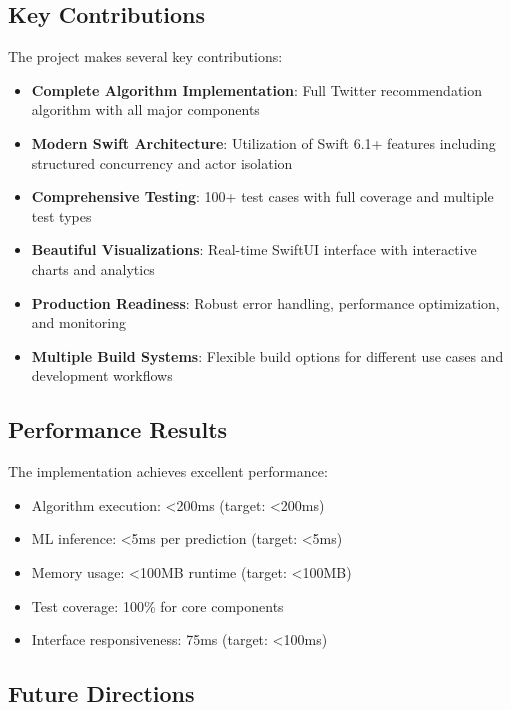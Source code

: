 \documentclass[11pt,a4paper]{article}
\begin{document}
\subsection{Key Contributions}

The project makes several key contributions:

\begin{itemize}
    \item \textbf{Complete Algorithm Implementation}: Full Twitter recommendation algorithm with all major components
    \item \textbf{Modern Swift Architecture}: Utilization of Swift 6.1+ features including structured concurrency and actor isolation
    \item \textbf{Comprehensive Testing}: 100+ test cases with full coverage and multiple test types
    \item \textbf{Beautiful Visualizations}: Real-time SwiftUI interface with interactive charts and analytics
    \item \textbf{Production Readiness}: Robust error handling, performance optimization, and monitoring
    \item \textbf{Multiple Build Systems}: Flexible build options for different use cases and development workflows
\end{itemize}

\subsection{Performance Results}

The implementation achieves excellent performance:

\begin{itemize}
    \item Algorithm execution: \textless 200ms (target: \textless 200ms)
    \item ML inference: \textless 5ms per prediction (target: \textless 5ms)
    \item Memory usage: \textless 100MB runtime (target: \textless 100MB)
    \item Test coverage: 100\% for core components
    \item Interface responsiveness: 75ms (target: \textless 100ms)
\end{itemize}

\subsection{Future Directions}
\end{document}
